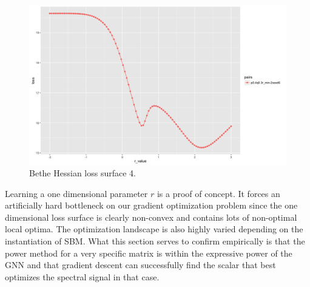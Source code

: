 \begin{figure}[H]
\begin{center}
\includegraphics[scale=0.4]{loss_surface_4.png}
\caption{Bethe Hessian loss surface 4.}
 \end{center}
\end{figure}
 
Learning a one dimensional parameter $r$ is a proof of concept.  It forces an artificially hard bottleneck on our gradient optimization problem since the one dimensional loss surface is clearly non-convex and contains lots of non-optimal local optima. The optimization landscape is also highly varied depending on the instantiation of SBM.  What this section serves to confirm empirically is that the power method for a very specific matrix is within the expressive power of the GNN and that gradient descent can successfully find the scalar that best optimizes the spectral signal in that case. 

\newpage

